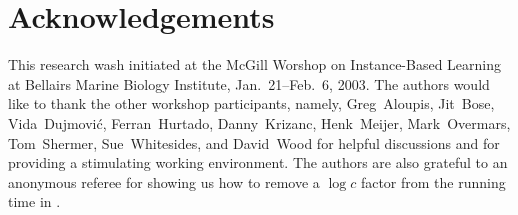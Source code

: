 \documentclass[lotsofwhite,charterfonts]{patmorin}
\begin{document}
\section*{Acknowledgements}

This research wash initiated at the McGill Worshop on Instance-Based
Learning at Bellairs Marine Biology Institute, Jan.~21--Feb.~6, 2003.
The authors would like to thank the other workshop participants,
namely, Greg~Aloupis, Jit~Bose, Vida~Dujmovi\'c, Ferran~Hurtado,
Danny~Krizanc, Henk~Meijer, Mark~Overmars, Tom~Shermer,
Sue~Whitesides, and David~Wood for helpful discussions and for
providing a stimulating working environment.  The authors are also
grateful to an anonymous referee for showing us how to remove a $\log
c$ factor from the running time in .





\end{document}
